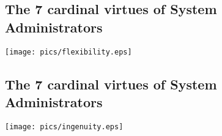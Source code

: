 \documentclass[xga]{xdvislides}
\begin{document}
%
%
%
\subsection{The 7 cardinal virtues of System Administrators}
\vspace*{\fill}
\begin{center}
	\texttt{[image: pics/flexibility.eps]}
\end{center}
\vspace*{\fill}

\subsection{The 7 cardinal virtues of System Administrators}
\vspace*{\fill}
\begin{center}
	\texttt{[image: pics/ingenuity.eps]} \\
\end{center}
\vspace*{\fill}
\end{document}
